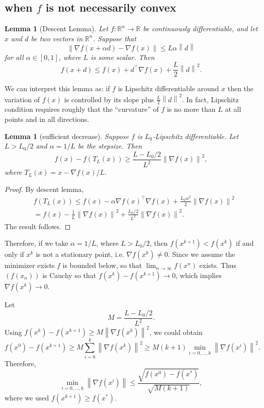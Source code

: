 \documentclass[12pt,a4paper]{report}
\numberwithin{equation}{section}
\theoremstyle{mystyle}
\newtheorem{lemma}[definition]{Lemma}
\newcommand{\R}{\mathbb{R}}
\newcommand{\grad}{\nabla}
\newcommand{\T}{\top}
\newcommand{\norm}[1]{\left\lVert #1 \right\rVert}
\begin{document}
	\subsection{when $f$ is not necessarily convex}
	\begin{lemma}[Descent Lemma]\label{lem:descent lemma}
			Let $f:\R^n \to \R$ be continuously differentiable, and let $x$ and $d$ be two vectors in $\R^n$. Suppose that
			$$
			\norm{\grad f(x+\alpha d)-\grad f(x)}\leq L \alpha \norm{d}
			$$
			for all $\alpha\in [0,1]$, where $L$ is some scalar. Then
			$$
			f(x+d)\leq f(x)+ d^\T \grad f(x) +\frac{L}{2}\norm{d}^2.
			$$
		\end{lemma}
	We can interpret this lemma as: if $f$ is Lipschitz differentiable around $x$ then the variation of $f(x)$ is controlled by its slope plus $\frac{L}{2}\norm{d}^2$. In fact, Lipschitz condition requires roughly that the ``curvature'' of $f$ is no more than $L$ at all points and in all directions.
	
	\begin{lemma}[sufficient decrease]\label{lem:sufficient decrease}
		Suppose $f$ is $L_0$-Lipschitz differentiable. Let $L >L_0/2$ and $\alpha=1/L$ be the stepsize. Then
		$$
		f(x)-f(T_L(x))\geq \frac{L-L_0/2}{L^2}\norm{\grad f(x)}^2,
		$$
		where $T_L(x)=x- \grad f(x)/L$.
	\end{lemma}
	\begin{proof}
		By descent lemma, 
		\begin{align*}
			&f(T_L(x))\leq f(x)-\alpha \grad f(x)^\T \grad f(x)+\frac{L_0\alpha^2}{2}\norm{\grad f(x)}^2\\
			&=f(x)-\frac{1}{L} \norm{\grad f(x)}^2+\frac{L_0/2}{L^2}\norm{\grad f(x)}^2.
		\end{align*}
	The result follows.
	\end{proof}

	Therefore, if we take $\alpha=1/L$, where $L>L_0/2$, then $f(x^{k+1})<f(x^k)$ if and only if $x^k$ is not a stationary point, i.e. $\grad f(x^k)\neq 0$. Since we assume the minimizer exists $f$ is bounded below, so that $\lim_{n\to\infty}f(x^n)$ exists. Thus $(f(x_n))$ is Cauchy so that $f(x^k)-f(x^{k+1})\to 0$, which implies $\grad f(x^k)\to 0$.
	
	Let 
	$$
	M=\frac{L-L_0/2}{L^2}.
	$$
	Using $f(x^k)-f(x^{k+1})\geq M\norm{\grad f(x^k)}^2$, we could obtain
	$$
	f(x^0)-f(x^{k+1})\geq M\sum_{i=0}^k \norm{\grad f(x^k)}^2\geq M(k+1)\min_{i=0,\dots,k}\norm{\grad f(x^i)}^2.
	$$
	Therefore,
	$$
	\min_{i=0,\dots,k}\norm{\grad f(x^i)} \leq \frac{\sqrt{f(x^0)-f(x^*)}}{\sqrt{M(k+1)}},
	$$
	where we used $f(x^{k+1})\geq f(x^*)$.
	
\end{document}
